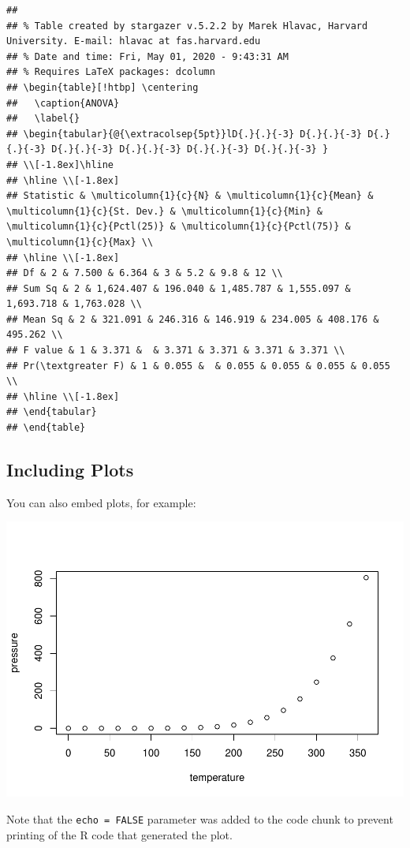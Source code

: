 \documentclass[]{article}
\begin{document}
\begin{verbatim}
## 
## % Table created by stargazer v.5.2.2 by Marek Hlavac, Harvard University. E-mail: hlavac at fas.harvard.edu
## % Date and time: Fri, May 01, 2020 - 9:43:31 AM
## % Requires LaTeX packages: dcolumn 
## \begin{table}[!htbp] \centering 
##   \caption{ANOVA} 
##   \label{} 
## \begin{tabular}{@{\extracolsep{5pt}}lD{.}{.}{-3} D{.}{.}{-3} D{.}{.}{-3} D{.}{.}{-3} D{.}{.}{-3} D{.}{.}{-3} D{.}{.}{-3} } 
## \\[-1.8ex]\hline 
## \hline \\[-1.8ex] 
## Statistic & \multicolumn{1}{c}{N} & \multicolumn{1}{c}{Mean} & \multicolumn{1}{c}{St. Dev.} & \multicolumn{1}{c}{Min} & \multicolumn{1}{c}{Pctl(25)} & \multicolumn{1}{c}{Pctl(75)} & \multicolumn{1}{c}{Max} \\ 
## \hline \\[-1.8ex] 
## Df & 2 & 7.500 & 6.364 & 3 & 5.2 & 9.8 & 12 \\ 
## Sum Sq & 2 & 1,624.407 & 196.040 & 1,485.787 & 1,555.097 & 1,693.718 & 1,763.028 \\ 
## Mean Sq & 2 & 321.091 & 246.316 & 146.919 & 234.005 & 408.176 & 495.262 \\ 
## F value & 1 & 3.371 &  & 3.371 & 3.371 & 3.371 & 3.371 \\ 
## Pr(\textgreater F) & 1 & 0.055 &  & 0.055 & 0.055 & 0.055 & 0.055 \\ 
## \hline \\[-1.8ex] 
## \end{tabular} 
## \end{table}
\end{verbatim}

\subsection{Including Plots}\label{including-plots}

You can also embed plots, for example:

\includegraphics{19_BH_NutrientAnalysis_Document_files/figure-latex/pressure-1.pdf}

Note that the \texttt{echo\ =\ FALSE} parameter was added to the code
chunk to prevent printing of the R code that generated the plot.
\end{document}
